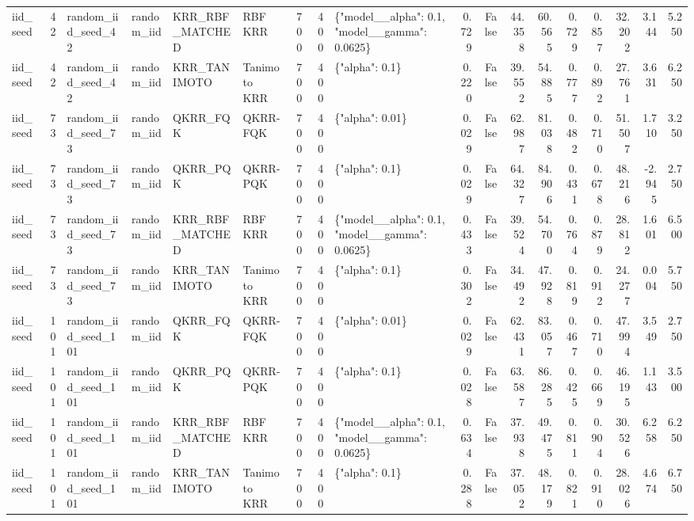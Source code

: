 \begin{tabular}{lrllllrrlrrrrrrrrr}
iid\_seed & 42 & random\_iid\_seed\_42 & random\_iid & KRR\_RBF\_MATCHED & RBF KRR & 700 & 400 & \{"model\_\_alpha": 0.1, "model\_\_gamma": 0.0625\} & 0.729 & False & 44.358 & 60.565 & 0.729 & 0.857 & 32.202 & 3.144 & 5.250 \\
iid\_seed & 42 & random\_iid\_seed\_42 & random\_iid & KRR\_TANIMOTO & Tanimoto KRR & 700 & 400 & \{"alpha": 0.1\} & 0.220 & False & 39.552 & 54.885 & 0.777 & 0.892 & 27.761 & 3.631 & 6.250 \\
iid\_seed & 73 & random\_iid\_seed\_73 & random\_iid & QKRR\_FQK & QKRR-FQK & 700 & 400 & \{"alpha": 0.01\} & 0.029 & False & 62.987 & 81.038 & 0.482 & 0.710 & 51.507 & 1.710 & 3.250 \\
iid\_seed & 73 & random\_iid\_seed\_73 & random\_iid & QKRR\_PQK & QKRR-PQK & 700 & 400 & \{"alpha": 0.1\} & 0.029 & False & 64.327 & 84.906 & 0.431 & 0.678 & 48.216 & -2.945 & 2.750 \\
iid\_seed & 73 & random\_iid\_seed\_73 & random\_iid & KRR\_RBF\_MATCHED & RBF KRR & 700 & 400 & \{"model\_\_alpha": 0.1, "model\_\_gamma": 0.0625\} & 0.433 & False & 39.524 & 54.700 & 0.764 & 0.879 & 28.812 & 1.601 & 6.500 \\
iid\_seed & 73 & random\_iid\_seed\_73 & random\_iid & KRR\_TANIMOTO & Tanimoto KRR & 700 & 400 & \{"alpha": 0.1\} & 0.302 & False & 34.492 & 47.928 & 0.819 & 0.912 & 24.277 & 0.004 & 5.750 \\
iid\_seed & 101 & random\_iid\_seed\_101 & random\_iid & QKRR\_FQK & QKRR-FQK & 700 & 400 & \{"alpha": 0.01\} & 0.029 & False & 62.431 & 83.057 & 0.467 & 0.710 & 47.994 & 3.549 & 2.750 \\
iid\_seed & 101 & random\_iid\_seed\_101 & random\_iid & QKRR\_PQK & QKRR-PQK & 700 & 400 & \{"alpha": 0.1\} & 0.028 & False & 63.587 & 86.285 & 0.425 & 0.669 & 46.195 & 1.143 & 3.500 \\
iid\_seed & 101 & random\_iid\_seed\_101 & random\_iid & KRR\_RBF\_MATCHED & RBF KRR & 700 & 400 & \{"model\_\_alpha": 0.1, "model\_\_gamma": 0.0625\} & 0.634 & False & 37.938 & 49.475 & 0.811 & 0.904 & 30.526 & 6.258 & 6.250 \\
iid\_seed & 101 & random\_iid\_seed\_101 & random\_iid & KRR\_TANIMOTO & Tanimoto KRR & 700 & 400 & \{"alpha": 0.1\} & 0.288 & False & 37.052 & 48.179 & 0.821 & 0.910 & 28.026 & 4.674 & 6.750 \\
\bottomrule
\end{tabular}
